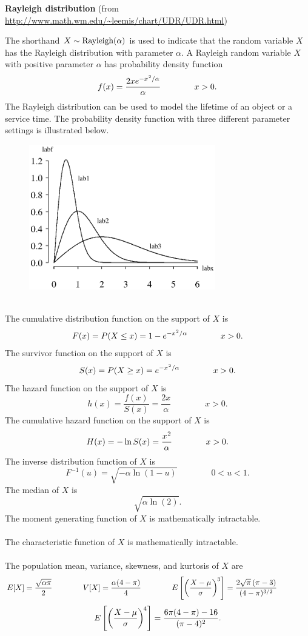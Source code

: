 \documentclass[12pt,fullpage]{article}
\begin{document}
\noindent
{\bf Rayleigh distribution} (from \color{blue}\url{http://www.math.wm.edu/~leemis/chart/UDR/UDR.html}\color{black})

\noindent
The shorthand $X \sim {\rm Rayleigh}(\alpha)$ is used to indicate that the
random variable $X$ has the Rayleigh distribution with parameter $\alpha$.
A Rayleigh random variable $X$ with positive parameter $\alpha$ has probability density function 
$$
f(x) = \frac{2xe^{-x^ {\kern 0.04 em 2}/\alpha}}{\alpha} \qquad \qquad x > 0.
$$
The Rayleigh distribution can be used to model the lifetime of an object or a service time.
The probability density function with three different parameter settings is illustrated below.
{\begin{figure}[h!]
\begin{center}
\includegraphics[width=3.2in]{RayleighPlot.ps}
\end{center}
\end{figure}}\\
The cumulative distribution function on the support of $X$ is
$$
F(x) = P(X \le x) = 1 - e^{-x^ {{\kern 0.04 em 2}}/\alpha}  \qquad \qquad x > 0.
$$
The survivor function on the support of $X$ is
$$
S(x) = P(X \ge x) = e^{-x^{\kern 0.04 em 2}/\alpha}  \qquad \qquad x > 0.
$$
The hazard function on the support of $X$ is
$$
h(x) = \frac{f(x)}{S(x)} = \frac{2x}{\alpha} \qquad \qquad x > 0.
$$
The cumulative hazard function on the support of $X$ is 
$$
H(x) = - \ln S(x) = \frac{x^{\kern 0.04 em 2}}{\alpha} \qquad \qquad x>0.
$$
The inverse distribution function of $X$ is 
$$
F^{-1} (u) = \sqrt{-\alpha \ln (1 - u)} \qquad \qquad 0 < u < 1.
$$
The median of $X$ is
$$
\sqrt{\alpha \ln(2)}.
$$
The moment generating function of $X$ is mathematically intractable.
\\
\\
The characteristic function of $X$ is mathematically intractable.
\\
\\
The population mean, variance, skewness, and kurtosis of $X$ are
$$
E[X] = \frac{\sqrt{\alpha \pi}} {2} \qquad \qquad 
V[X] = \frac{\alpha(4 - \pi)} {4} \qquad \qquad 
E\left[ \left( \frac{X - \mu}{\sigma} \right) ^ {\kern -0.08 em 3} \right] = \frac{2 \sqrt{\pi} \, (\pi - 3)} {(4 - \pi) ^ {3 / 2}} \qquad \qquad 
$$
$$
E\left[ \left( \frac{X - \mu}{\sigma} \right) ^ {\kern -0.08 em 4} \right] = \frac{6 \pi (4 - \pi) - 16}{(\pi - 4) ^ 2}.
$$
\end{document}
